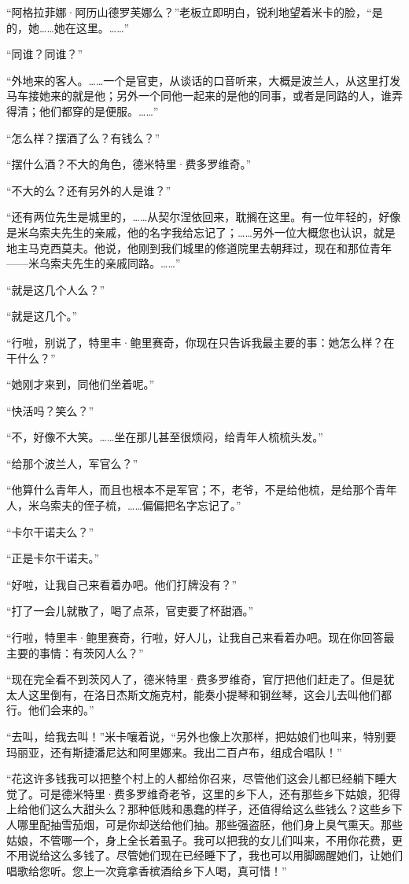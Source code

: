 \par “阿格拉菲娜·阿历山德罗芙娜么？”老板立即明白，锐利地望着米卡的脸，“是的，她……她在这里。……”
\par “同谁？同谁？”
\par “外地来的客人。……一个是官吏，从谈话的口音听来，大概是波兰人，从这里打发马车接她来的就是他；另外一个同他一起来的是他的同事，或者是同路的人，谁弄得清；他们都穿的是便服。……”
\par “怎么样？摆酒了么？有钱么？”
\par “摆什么酒？不大的角色，德米特里·费多罗维奇。”
\par “不大的么？还有另外的人是谁？”
\par “还有两位先生是城里的，……从契尔涅依回来，耽搁在这里。有一位年轻的，好像是米乌索夫先生的亲戚，他的名字我给忘记了；……另外一位大概您也认识，就是地主马克西莫夫。他说，他刚到我们城里的修道院里去朝拜过，现在和那位青年——米乌索夫先生的亲戚同路。……”
\par “就是这几个人么？”
\par “就是这几个。”
\par “行啦，别说了，特里丰·鲍里赛奇，你现在只告诉我最主要的事：她怎么样？在干什么？”
\par “她刚才来到，同他们坐着呢。”
\par “快活吗？笑么？”
\par “不，好像不大笑。……坐在那儿甚至很烦闷，给青年人梳梳头发。”
\par “给那个波兰人，军官么？”
\par “他算什么青年人，而且也根本不是军官；不，老爷，不是给他梳，是给那个青年人，米乌索夫的侄子梳，……偏偏把名字忘记了。”
\par “卡尔干诺夫么？”
\par “正是卡尔干诺夫。”
\par “好啦，让我自己来看着办吧。他们打牌没有？”
\par “打了一会儿就散了，喝了点茶，官吏要了杯甜酒。”
\par “行啦，特里丰·鲍里赛奇，行啦，好人儿，让我自己来看着办吧。现在你回答最主要的事情：有茨冈人么？”
\par “现在完全看不到茨冈人了，德米特里·费多罗维奇，官厅把他们赶走了。但是犹太人这里倒有，在洛日杰斯文施克村，能奏小提琴和钢丝琴，这会儿去叫他们都行。他们会来的。”
\par “去叫，给我去叫！”米卡嚷着说，“另外也像上次那样，把姑娘们也叫来，特别要玛丽亚，还有斯捷潘尼达和阿里娜来。我出二百卢布，组成合唱队！”
\par “花这许多钱我可以把整个村上的人都给你召来，尽管他们这会儿都已经躺下睡大觉了。可是德米特里·费多罗维奇老爷，这里的乡下人，还有那些乡下姑娘，犯得上给他们这么大甜头么？那种低贱和愚蠢的样子，还值得给这么些钱么？这些乡下人哪里配抽雪茄烟，可是你却送给他们抽。那些强盗胚，他们身上臭气熏天。那些姑娘，不管哪一个，身上全长着虱子。我可以把我的女儿们叫来，不用你花费，更不用说给这么多钱了。尽管她们现在已经睡下了，我也可以用脚踢醒她们，让她们唱歌给您听。您上一次竟拿香槟酒给乡下人喝，真可惜！”
